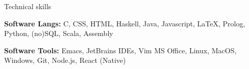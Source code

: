 \documentclass[10pt]{resume} %
\begin{document}
\begin{rSection}{Technical skills}
    \item \textbf{Software Langs:}
        C,
        CSS,
        HTML,
        Haskell,
        Java,
        Javascript,
        \LaTeX,
        Prolog,
        Python,
        (no)SQL,
        Scala,
        Assembly
    \item \textbf{Software Tools:}
        Emacs,
        JetBrains IDEs,
        Vim
        MS Office,
        Linux,
        MacOS,
        Windows,
        Git,
        Node.js,
        React (Native)
\end{rSection}

\end{document}
